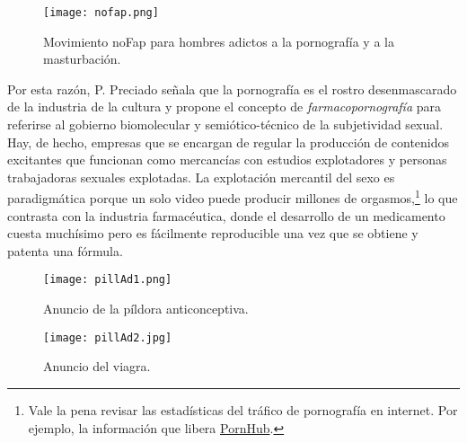 \begin{figure}[htbp]
	\centering
	\texttt{[image: nofap.png]}
	\caption[Movimiento noFap.]{Movimiento noFap para hombres adictos a la pornografía y a la masturbación.}
	\label{fig:noFap}
\end{figure}

Por esta razón, P. Preciado señala que la pornografía es el rostro desenmascarado de la industria de la cultura y propone el concepto de \emph{farmacopornografía} para referirse al gobierno biomolecular y semiótico-técnico de la subjetividad sexual. Hay, de hecho, empresas que se encargan de regular la producción de contenidos excitantes que funcionan como mercancías con estudios explotadores y personas trabajadoras sexuales explotadas. La explotación mercantil del sexo es paradigmática porque un solo video puede producir millones de orgasmos,\footnote{Vale la pena revisar las estadísticas del tráfico de pornografía en internet. Por ejemplo, la información que libera \href{www.pornhub.com/insights/category/stats}{PornHub}.} lo que contrasta con la industria farmacéutica, donde el desarrollo de un medicamento cuesta muchísimo pero es fácilmente reproducible una vez que se obtiene y patenta una fórmula.

\begin{figure}[htbp]
	\centering
	\texttt{[image: pillAd1.png]}
	\caption{Anuncio de la píldora anticonceptiva.}
	\label{fig:anticonceptiva}
\end{figure}

\begin{figure}[htbp]
	\centering
	\texttt{[image: pillAd2.jpg]}
	\caption{Anuncio del viagra.}
	\label{fig:viagra}
\end{figure}

